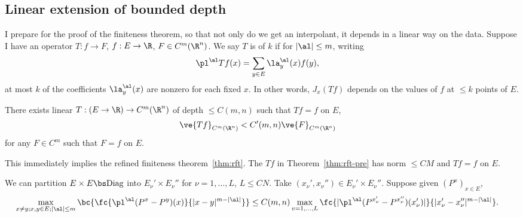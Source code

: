 \subsection{Linear extension of bounded depth}

I prepare for the proof of the finiteness theorem, so that not only do we get an interpolant, it depends in a linear way on the data. Suppose I have an operator $T:f\to F$, $f:E\to \R$, $F\in C^m(\R^n)$.  %
We say $T$ is of  $k$  if  for $|\al|\le m$, writing
\begin{align}
\pl^\al Tf(x) &= \sum_{y\in E} \la^\al_y(x) f(y),
\end{align}
at most $k$ of the coefficients $\la_y^\al(x)$ are nonzero for each fixed $x$. 
In other words, $J_x(Tf)$ depends on the values of $f$ at $\le k$ points of $E$.

\begin{thm}\label{thm:rft-pre}
There exists linear $T: (E\to \R) \to C^m(\R^n)$ of depth $\le C(m,n)$ such that $Tf=f$ on $E$, 
\begin{align}
\ve{Tf}_{C^m(\R^n)}&<C'(m,n)\ve{F}_{C^m(\R^n)}
\end{align}
for any $F\in C^m$ such that $F=f$ on $E$.
\end{thm}
This immediately  implies the refined finiteness theorem~\ref{thm:rft}. The $Tf$ in Theorem~\ref{thm:rft-pre} has norm $\le CM$ and $Tf=f$ on $E$. 

We can partition $E\times E\bs \text{Diag}$ into $E_\nu'\times E_\nu''$ for $\nu=1,\ldots, L$, $L\le CN$. Take $(x_\nu',x_\nu'')\in E_\nu'\times E_\nu''$. Suppose given $(P^x)_{x\in E}$,
\begin{align}
\max_{x\ne y; x,y\in E;|\al|\le m}
\bc{
\fc{\pl^\al(P^x-P^y)(x)}{|x-y|^{m-|\al|}}
}
&\le  C(m,n) \max_{v=1,\ldots, L}
\fc{|\pl^\al(P^{x_\nu'}-P^{x_\nu''})(x_\nu')|}{|x_\nu'-x_\nu''|^{m-|\al|}}.
\end{align}
